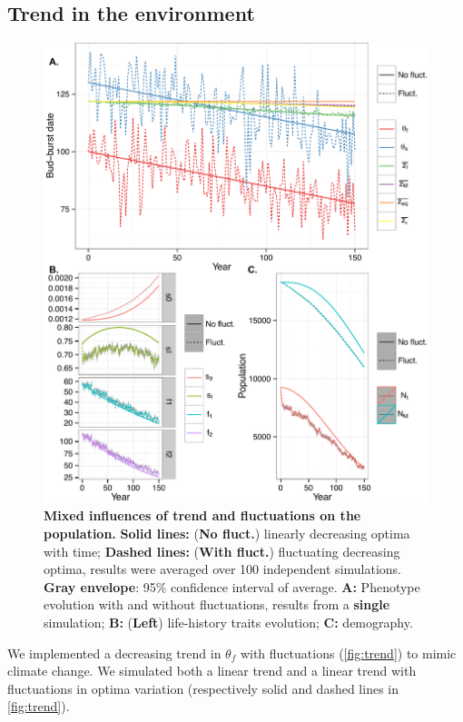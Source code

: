 \subsection*{Trend in the environment}

\begin{figure}[ht!]
	\centering
	\includegraphics[scale=1]{Figures/Trend.pdf}
	\caption{\textbf{Mixed influences of trend and fluctuations on the population.} \textbf{Solid lines:} (\textbf{No fluct.}) linearly decreasing optima with time; \textbf{Dashed lines:} (\textbf{With fluct.}) fluctuating decreasing optima, results were averaged over 100 independent simulations. \textbf{Gray envelope}: 95\% confidence interval of average. \textbf{A:} Phenotype evolution with and without fluctuations, results from a \textbf{single} simulation; \textbf{B:} (\textbf{Left}) life-history traits evolution; \textbf{C:} demography.}
	\label{fig:trend}
\end{figure}

We implemented a decreasing trend in $\theta_f$ with fluctuations (\autoref{fig:trend}) to mimic climate change. We simulated both a linear trend and a linear trend with fluctuations in optima variation (respectively solid and dashed lines in \autoref{fig:trend}).

